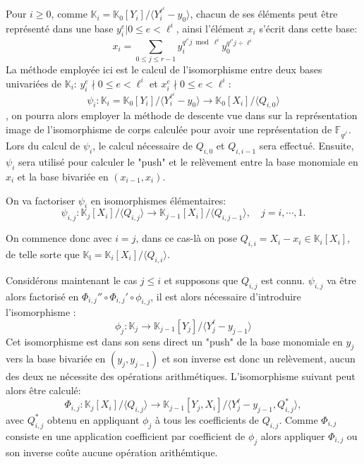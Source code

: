 \documentclass[10pt,a4paper]{book}
\theoremstyle{plain}
\theoremstyle{definition}
\theoremstyle{definition}
\theoremstyle{definition}
\theoremstyle{definition}
\theoremstyle{remark}
\theoremstyle{remark}
\begin{document}
Pour $i \geqslant 0$, comme $\mathbb{K}_i=\mathbb{K}_0[Y_i]/\langle Y_i^{\ell^i} - y_0 \rangle$, chacun de ses éléments peut être représenté dans une base ${y_i^e | 0 \leqslant e < \ell^i }$, ainsi l'élément $x_i$ s'écrit dans cette base:
\begin{equation*}
x_i= \sum_{0 \leqslant j \leqslant r-1}y_i^{q^{\ell^i}j \bmod \ell^i}y_0^{q^{\ell^i}j \div \ell^i}
\end{equation*}
La méthode employée ici est le calcul de l'isomorphisme entre deux bases univariées de $\mathbb{K}_i$: ${y_i^e \nmid 0 \leqslant e < \ell^i}$ et ${x_i^e \nmid 0 \leqslant e < \ell^i}$:
\begin{equation*}
\psi_i: \mathbb{K}_i=\mathbb{K}_0[Y_i]/\langle Y_i^{\ell^i}-y_0 \rangle \to \mathbb{K}_0[X_i]/\langle Q_{i,0} \rangle
\end{equation*}
 , on pourra alors employer la méthode de descente vue dans \cite{Shoup88} sur la représentation image de l'isomorphisme de corps calculée pour avoir une représentation de $\mathbb{F}_{q^{\ell^i}}$. Lors du calcul de $\psi_i$, le calcul nécessaire de $Q_{i,0}$ et $Q_{i,i-1}$ sera effectué. Ensuite, $\psi_i$ sera utilisé pour calculer le "push" et le relèvement entre la base monomiale en $x_i$ et la base bivariée en $(x_{i-1},x_i)$.
 
 On va factoriser $\psi_i$ en isomorphismes élémentaires:
 \begin{equation*}
 \psi_{i,j}:\mathbb{K}_{j}[X_i]/\langle Q_{i,j} \rangle \to \mathbb{K}_{j-1}[X_i]/ \langle Q_{i,j-1} \rangle, \quad j=i, \cdots,1. 
 \end{equation*}
 
On commence donc avec $i=j$, dans ce cas-là on pose $Q_{i,i}=X_i-x_i \in \mathbb{K}_i[X_i]$, de telle sorte que $\mathbb{K_i}=\mathbb{K}_i[X_i] / \langle Q_{i,i} \rangle $.

Considérons maintenant le cas $j \leqslant i$ et supposons que $Q_{i,j}$ est connu. $\psi_{i,j}$ va être alors factorisé en $\Phi_{i,j}'' \circ \Phi_{i,j}' \circ \phi_{i,j}$, il est alors nécessaire d'introduire l'isomorphisme :
\begin{equation*}
\phi_j:\mathbb{K}_j \to \mathbb{K}_{j-1}[Y_j]/\langle Y_j^{\ell}-y_{j-1} \rangle
\end{equation*}
Cet isomorphisme est dans son sens direct un "push" de la base monomiale en $y_j$ vers la base bivariée en $(y_j,y_{j-1})$ et son inverse est donc un relèvement, aucun des deux ne nécessite des opérations arithmétiques. L'isomorphisme suivant peut alors être calculé:
\begin{equation*}
\Phi_{i,j}: \mathbb{K}_j[X_i]/\langle Q_{i,j} \rangle \to \mathbb{K}_{j-1}[Y_j,X_i]/\langle Y_j^{\ell}-y_{j-1},Q_{i,j}^* \rangle , 
\end{equation*} 
avec $Q_{i,j}^*$ obtenu en appliquant $\phi_j$ à tous les coefficients de $Q_{i,j}$. Comme $\Phi_{i,j}$ consiste en une application coefficient par coefficient de $\phi_j$ alors appliquer $\Phi_{i,j}$ ou son inverse coûte aucune opération arithémtique.
\end{document}
